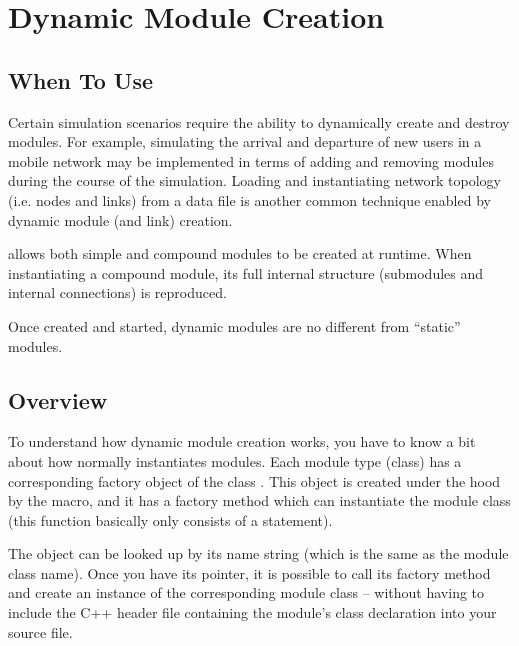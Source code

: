 \section{Dynamic Module Creation}
\label{sec:simple-modules:creating-modules}

\subsection{When To Use}
\label{sec:simple-modules:dynamic-creation:when-to-use}

Certain simulation scenarios require the ability to dynamically create
and destroy modules. For example, simulating the arrival and departure
of new users in a mobile network may be implemented in terms of adding
and removing modules during the course of the simulation. Loading and
instantiating network topology (i.e. nodes and links) from a data file
is another common technique enabled by dynamic module (and link) creation.

{{\opp}} allows both simple and compound modules to be created at runtime.
When instantiating a compound module, its full internal structure
(submodules and internal connections) is reproduced.

Once created and started, dynamic modules are no different from
``static'' modules.


\subsection{Overview}
\label{sec:simple-modules:dynamic-creation:overview}

To understand how dynamic module creation works, you have to know a
bit about how {\opp} normally instantiates modules. Each module type
(class) has a corresponding factory object of the class
. This object is created under the hood by the
 macro, and it has a factory
method which can instantiate the module class (this function basically
only consists of a  statement).

The  object can be looked up by its name
string (which is the same as the module class name). Once you have its
pointer, it is possible to call its factory method and create an
instance of the corresponding module class -- without having to
include the C++ header file containing the module's class declaration
into your source file.

